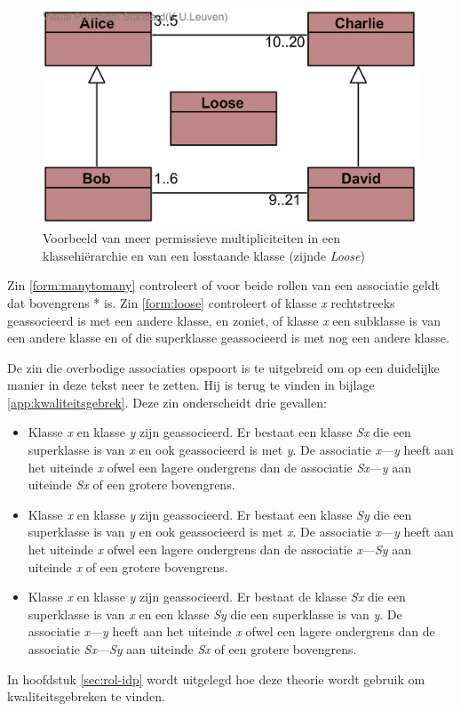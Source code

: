 \begin{figure}
	\includegraphics{chap-kwaliteitsgebrek/hierarchy.png}
	\caption{Voorbeeld van meer permissieve multipliciteiten in een klassehi\"erarchie en van een losstaande klasse (zijnde \textit{Loose})}
	\label{fig:hierarchie}
\end{figure}

Zin \ref{form:manytomany} controleert of voor beide rollen van een associatie geldt dat bovengrens * is. Zin \ref{form:loose} controleert of klasse \textit{x} rechtstreeks geassocieerd is met een andere klasse, en zoniet, of klasse \textit{x} een subklasse is van een andere klasse en of die superklasse geassocieerd is met nog een andere klasse.

De zin die overbodige associaties opspoort is te uitgebreid om op een duidelijke manier in deze tekst neer te zetten. Hij is terug te vinden in bijlage \ref{app:kwaliteitsgebrek}.
Deze zin onderscheidt drie gevallen:

\begin{itemize}
	\item Klasse \textit{x} en klasse \textit{y} zijn geassocieerd. Er bestaat een klasse \textit{Sx} die een superklasse is van \textit{x} en ook geassocieerd is met \textit{y}. De associatie \textit{x}---\textit{y} heeft aan het uiteinde \textit{x} ofwel een lagere ondergrens dan de associatie \textit{Sx}---\textit{y} aan uiteinde \textit{Sx} of een grotere bovengrens.
	\item Klasse \textit{x} en klasse \textit{y} zijn geassocieerd. Er bestaat een klasse \textit{Sy} die een superklasse is van \textit{y} en ook geassocieerd is met \textit{x}. De associatie \textit{x}---\textit{y} heeft aan het uiteinde \textit{x} ofwel een lagere ondergrens dan de associatie \textit{x}---\textit{Sy} aan uiteinde \textit{x} of een grotere bovengrens.
	\item Klasse \textit{x} en klasse \textit{y} zijn geassocieerd. Er bestaat de klasse \textit{Sx} die een superklasse is van \textit{x} en een klasse \textit{Sy} die een superklasse is van \textit{y}. De associatie \textit{x}---\textit{y} heeft aan het uiteinde \textit{x} ofwel een lagere ondergrens dan de associatie \textit{Sx}---\textit{Sy} aan uiteinde \textit{Sx} of een grotere bovengrens.
\end{itemize}

In hoofdstuk \ref{sec:rol-idp} wordt uitgelegd hoe deze theorie wordt gebruik om kwaliteitsgebreken te vinden.